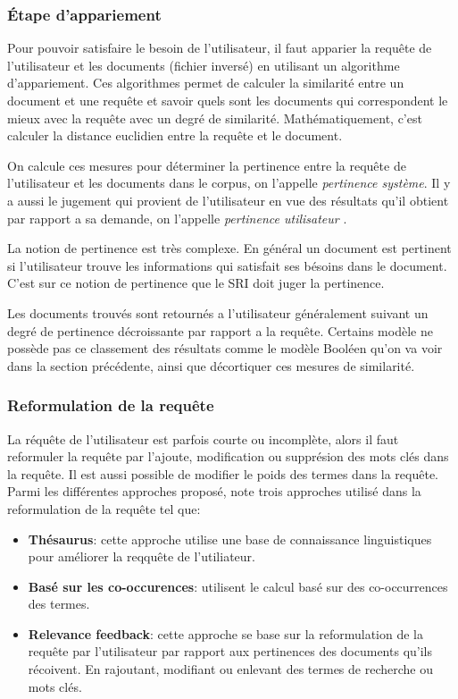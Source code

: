 \subsubsection{Étape d’appariement}
\label{sec:etape-appariement}
Pour pouvoir satisfaire le besoin de l'utilisateur, il faut apparier la requête de l'utilisateur et les documents (fichier inversé) en utilisant un algorithme d'appariement. Ces algorithmes permet de calculer la similarité entre un document et une requête et savoir 
quels sont les documents qui correspondent le mieux avec la requête avec un degré de similarité. Mathématiquement, c'est calculer la distance euclidien entre la requête et le document.

On calcule ces mesures pour déterminer la pertinence entre la requête de l'utilisateur et les documents dans le corpus, on l'appelle \textit{pertinence système}. Il y a aussi le jugement qui provient de l'utilisateur en vue des résultats qu'il obtient par rapport a sa demande, on l'appelle \textit{pertinence utilisateur} \citep{vsm-images}.

La notion de pertinence est très complexe. En général un document est pertinent si l'utilisateur trouve les informations qui satisfait ses bésoins dans le document. C'est sur ce notion de pertinence que le SRI doit juger la pertinence. \citep{salton1989automatique}

Les documents trouvés sont retournés a l’utilisateur généralement suivant un degré de pertinence décroissante par rapport a la requête. Certains modèle ne possède pas ce classement des résultats comme le modèle Booléen qu'on va voir dans la section précédente, ainsi que décortiquer ces mesures de similarité.

\subsubsection{Reformulation de la requête}
La réquête de l'utilisateur est parfois courte ou incomplète, alors il faut reformuler la requête par l'ajoute, modification ou supprésion des mots clés dans la requête. Il est aussi possible de modifier le poids des termes dans la requête. Parmi les différentes approches proposé, \citeauthor{amelioration-ri-approche-semantique} \citep{amelioration-ri-approche-semantique} note trois approches utilisé dans la reformulation de la requête tel que:

\begin{itemize}
    \item \textbf{Thésaurus}: cette approche utilise une base de connaissance linguistiques pour améliorer la reqquête de l'utiliateur.
    \item \textbf{Basé sur les co-occurences}: utilisent le calcul basé sur des co-occurrences des termes.
    \item \textbf{Relevance feedback}: cette approche se base sur la reformulation de la requête par l'utilisateur par rapport aux pertinences des documents qu'ils récoivent. En rajoutant, modifiant ou enlevant des termes de recherche ou mots clés.
\end{itemize}

